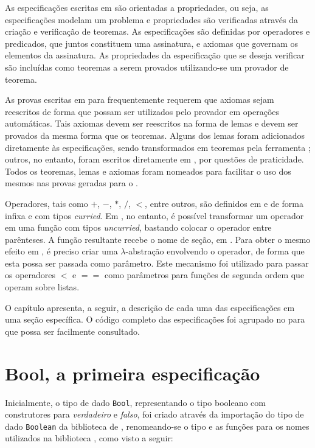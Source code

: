 As especificações escritas em \HasCASL são orientadas a propriedades, ou seja, as especificações modelam um problema e propriedades são verificadas através da criação e verificação de teoremas.
As especificações são definidas por operadores e predicados, que juntos constituem uma assinatura, e axiomas que governam os elementos da assinatura.
As propriedades da especificação que se deseja verificar são incluídas como teoremas a serem provados utilizando-se um provador de teorema.

As provas escritas em \HOL para \Isabelle frequentemente requerem que axiomas sejam reescritos de forma que possam ser utilizados pelo provador em operações automáticas.
Tais axiomas devem ser reescritos na forma de lemas e devem ser provados da mesma forma que os teoremas.
Alguns dos lemas foram adicionados diretamente às especificações, sendo transformados em teoremas pela ferramenta \Hets; outros, no entanto, foram escritos diretamente em \HOL, por questões de praticidade.
Todos os teoremas, lemas e axiomas foram nomeados para facilitar o uso dos mesmos nas provas geradas para o \Isabelle.

Operadores, tais como $+$, $-$, $*$, $/$, $<$, entre outros, são definidos em \CASL e \Haskell de forma infixa e com tipos \textit{curried}.
Em \Haskell, no entanto, é possível transformar um operador em uma função com tipos \textit{uncurried}, bastando colocar o operador entre parênteses.
A função resultante recebe o nome de seção, em \Haskell.
Para obter o mesmo efeito em \HasCASL, é preciso criar uma $\lambda$-abstração envolvendo o operador, de forma que esta possa ser passada como parâmetro.
Este mecanismo foi utilizado para passar os operadores $<$ e $==$ como parâmetros para funções de segunda ordem que operam sobre listas.

O capítulo apresenta, a seguir, a descrição de cada uma das especificações em uma seção específica.
O código completo das especificações foi agrupado no  para que possa ser facilmente consultado.

\section{Bool, a primeira especificação}

Inicialmente, o tipo de dado \Verb.Bool., representando o tipo booleano com construtores para \textit{verdadeiro} e \textit{falso}, foi criado através da importação do tipo de dado \Verb.Boolean. da biblioteca de \CASL, renomeando-se o tipo e as funções para os nomes utilizados na biblioteca \Prelude, como visto a seguir:

